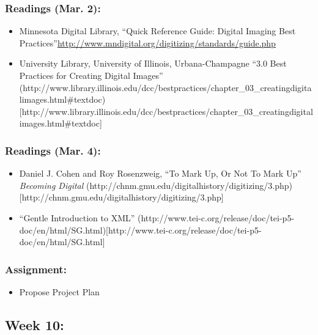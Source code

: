 \documentclass[]{article}
\begin{document}
\subsubsection{Readings (Mar. 2):}\label{readings-mar.-2}

\begin{itemize}
\itemsep1pt\parskip0pt
\item
  Minnesota Digital Library, ``Quick Reference Guide: Digital Imaging
  Best
  Practices''\url{http://www.mndigital.org/digitizing/standards/guide.php}
\item
  University Library, University of Illinois, Urbana-Champagne ``3.0
  Best Practices for Creating Digital Images''
  (http://www.library.illinois.edu/dcc/bestpractices/chapter\_03\_creatingdigitalimages.html\#textdoc){[}http://www.library.illinois.edu/dcc/bestpractices/chapter\_03\_creatingdigitalimages.html\#textdoc{]}
\end{itemize}

\subsubsection{Readings (Mar. 4):}\label{readings-mar.-4}

\begin{itemize}
\itemsep1pt\parskip0pt
\item
  Daniel J. Cohen and Roy Rosenzweig, ``To Mark Up, Or Not To Mark Up''
  \emph{Becoming Digital}
  (http://chnm.gmu.edu/digitalhistory/digitizing/3.php){[}http://chnm.gmu.edu/digitalhistory/digitizing/3.php{]}
\item
  ``Gentle Introduction to XML''
  (http://www.tei-c.org/release/doc/tei-p5-doc/en/html/SG.html){[}http://www.tei-c.org/release/doc/tei-p5-doc/en/html/SG.html{]}
\end{itemize}

\subsubsection{Assignment:}\label{assignment-7}

\begin{itemize}
\itemsep1pt\parskip0pt
\item
  Propose Project Plan
\end{itemize}

\subsection{Week 10:}\label{week-10}
\end{document}
